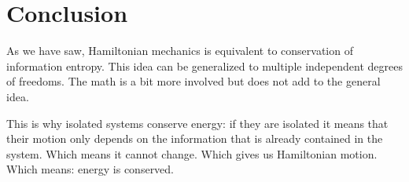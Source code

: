 \documentclass[aps,pra,10pt,floatfix,nofootinbib]{revtex4-1}
\theoremstyle{definition}
\begin{document}
\section{Conclusion}
As we have saw, Hamiltonian mechanics is equivalent to conservation of information entropy. This idea can be generalized to multiple independent degrees of freedoms. The math is a bit more involved but does not add to the general idea.

This is why isolated systems conserve energy: if they are isolated it means that their motion only depends on the information that is already contained in the system. Which means it cannot change. Which gives us Hamiltonian motion. Which means: energy is conserved.
\end{document}
